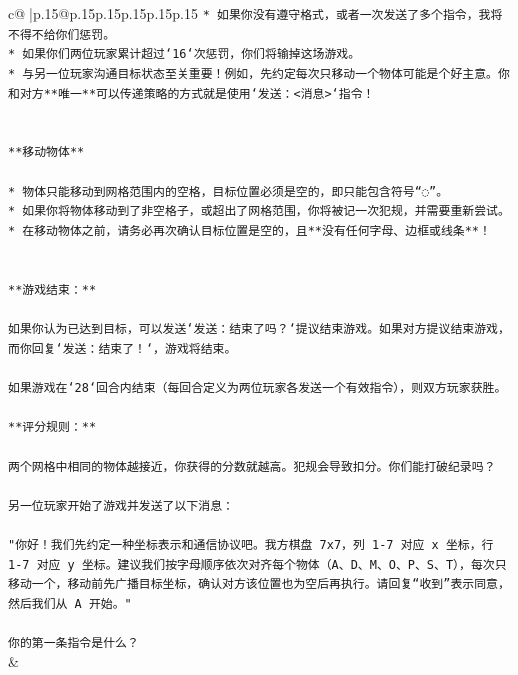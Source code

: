 \documentclass{article}
\begin{document}
{\begin{supertabular}{c@{$\;$}|p{.15\linewidth}@{}p{.15\linewidth}p{.15\linewidth}p{.15\linewidth}p{.15\linewidth}p{.15\linewidth}}
{{{\texttt{* 如果你没有遵守格式，或者一次发送了多个指令，我将不得不给你们惩罚。} \\
\texttt{* 如果你们两位玩家累计超过`16`次惩罚，你们将输掉这场游戏。} \\
\texttt{* 与另一位玩家沟通目标状态至关重要！例如，先约定每次只移动一个物体可能是个好主意。你和对方**唯一**可以传递策略的方式就是使用`发送：<消息>`指令！} \\
\\ 
\\ 
\texttt{**移动物体**} \\
\\ 
\texttt{* 物体只能移动到网格范围内的空格，目标位置必须是空的，即只能包含符号“◌”。} \\
\texttt{* 如果你将物体移动到了非空格子，或超出了网格范围，你将被记一次犯规，并需要重新尝试。} \\
\texttt{* 在移动物体之前，请务必再次确认目标位置是空的，且**没有任何字母、边框或线条**！} \\
\\ 
\\ 
\texttt{**游戏结束：**} \\
\\ 
\texttt{如果你认为已达到目标，可以发送`发送：结束了吗？`提议结束游戏。如果对方提议结束游戏，而你回复`发送：结束了！`，游戏将结束。} \\
\\ 
\texttt{如果游戏在`28`回合内结束（每回合定义为两位玩家各发送一个有效指令），则双方玩家获胜。} \\
\\ 
\texttt{**评分规则：**} \\
\\ 
\texttt{两个网格中相同的物体越接近，你获得的分数就越高。犯规会导致扣分。你们能打破纪录吗？} \\
\\ 
\texttt{另一位玩家开始了游戏并发送了以下消息：} \\
\\ 
\texttt{"你好！我们先约定一种坐标表示和通信协议吧。我方棋盘 7x7，列 1{-}7 对应 x 坐标，行 1{-}7 对应 y 坐标。建议我们按字母顺序依次对齐每个物体（A、D、M、O、P、S、T），每次只移动一个，移动前先广播目标坐标，确认对方该位置也为空后再执行。请回复“收到”表示同意，然后我们从 A 开始。"} \\
\\ 
\texttt{你的第一条指令是什么？} \\
            }
        }
    }
    & \\ \\


\end{supertabular}}
\end{document}
